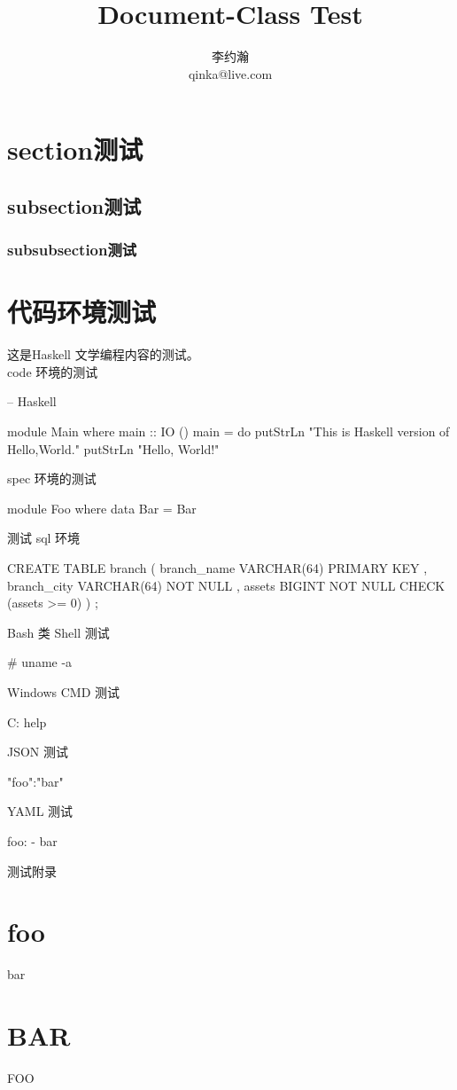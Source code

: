 \documentclass{dingo}
\title{Document-Class Test}
\author{李约瀚\\ qinka@live.com}
\begin{document}
    \makecover
    \makecontent
    \section{section测试}
    \subsection{subsection测试}
    \subsubsection{subsubsection测试}
    \section{代码环境测试}
    这是Haskell 文学编程内容的测试。
    \\
    code 环境的测试
    \begin{code}
-- Haskell

module Main where
	main :: IO ()
	main = do\rightarrow
		putStrLn "This is Haskell version of Hello,World."
		putStrLn "Hello, World!"
    \end{code}
	 spec 环境的测试
	\begin{spec}
module Foo where
	data Bar = Bar
    \end{spec}
    测试 sql 环境
    \begin{sql}
CREATE TABLE branch
	( branch_name VARCHAR(64) PRIMARY KEY
	, branch_city VARCHAR(64) NOT NULL
	, assets      BIGINT NOT NULL CHECK (assets >= 0)
	)
;
    \end{sql}
    Bash 类 Shell 测试
    \begin{shell}
 # uname -a
    \end{shell}
    Windows CMD 测试
    \begin{cmd}
 C:\> help
    \end{cmd}
    JSON 测试
    \begin{json}
 {"foo":"bar"}
    \end{json}
    YAML 测试
    \begin{yaml}
 foo:
   - bar  
    \end{yaml}
    测试附录
    \begin{appendix}
    	\section{foo}
    	bar
    	\section{BAR}
    	FOO
     \end{appendix}
\end{document}
